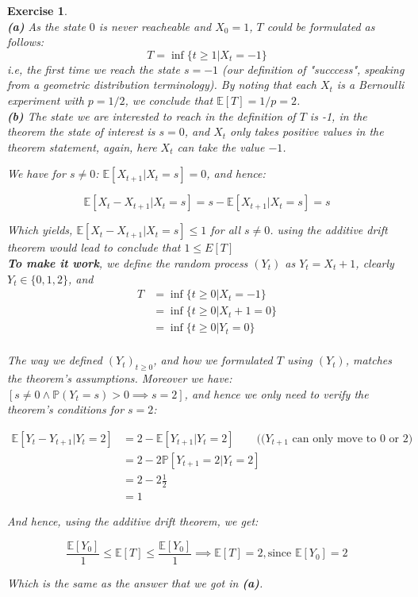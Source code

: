 \documentclass{article}
\newtheorem{exo}{Exercise}
\def\P{\mathbb{P}}
\def\E{\mathbb{E}}
\begin{document}
\begin{exo}{\ \\}
\noindent
\textbf{(a)} As the state $0$ is never reacheable and $X_0 = 1$, $T$ could be formulated as follows: \[T = \inf\{t \geq 1 | X_t = -1 \} \] i.e, the first time we reach the state $s = -1$ (our definition of "succcess", speaking from a geometric distribution terminology). By noting that each $X_t$ is a Bernoulli experiment with $p =1/2$, we conclude that $\E[T] = 1/p = 2$. \\

\noindent
\textbf{(b)} The state we are interested to reach in the definition of $T$ is -1, in the theorem the state of interest is $s = 0$, and $X_t$ only takes positive values in the theorem statement, again, here $X_t$ can take the value $-1$.

We have for $s \neq 0$: $\E[X_{t+1}|X_t = s] = 0$, and hence: 

\[ \E[X_t - X_{t+1} | X_t =s] =  s - \E[X_{t+1}|X_t = s] = s \]

Which yields, $\E[X_t - X_{t+1}| X_t = s] \leq 1$ for all $s \neq 0$. using the additive drift theorem would lead to conclude that $1 \leq E[T]$ \\

\textbf{To make it work}, we define the random process $(Y_t)$ as $Y_t = X_t +1$, clearly $Y_t \in \{0, 1, 2\}$, and 
\begin{align*}
    T 
    &= \inf\{ t \geq 0 | X_t = -1\} \\
    &= \inf\{ t \geq 0 | X_t+ 1 = 0\} \\
    &= \inf\{ t \geq 0 | Y_t = 0\} \\ 
\end{align*}

The way we defined $(Y_t)_{t\geq0}$, and how we formulated $T$ using $(Y_t)$, matches the theorem's assumptions. Moreover we have:
$[s \neq 0 \land \P(Y_t = s)> 0 \implies s=2]$, and hence we only need to verify the theorem's conditions for $s=2$:

\begin{align*}
    \E[Y_t - Y_{t+1}| Y_t  = 2] 
        &= 2 - \E[Y_{t+1}|Y_t = 2] 
        \quad \quad \text{(($Y_{t+1}$ can only move to 0 or 2)}\\
        &= 2 - 2\P[Y_{t+1}=2|Y_t = 2] \\
        &= 2 - 2 \frac{1}{2} \\ 
        &= 1
\end{align*}

And hence, using the additive drift theorem, we get:

\[  \frac{\E[Y_0]}{1} \leq \E[T] \leq \frac{\E[Y_0]}{1} \implies  \E[T] =  2, \text{since $\E[Y_0]=2$} \]

Which is the same as the answer that we got in \textbf{(a)}. 


\end{exo}
\end{document}
